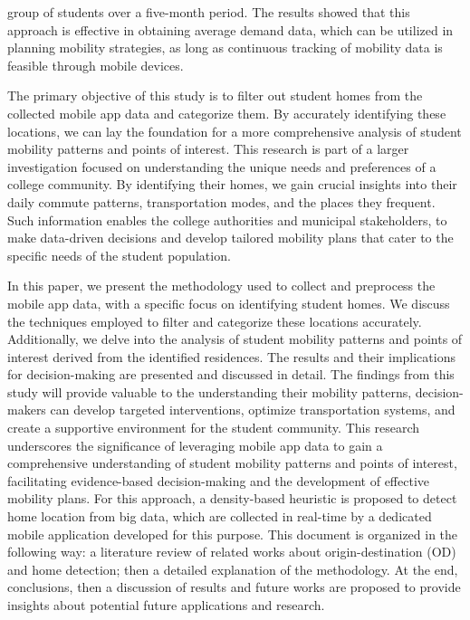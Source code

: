 \documentclass[runningheads]{llncs}
\begin{document}
group of students over a five-month period. The results showed that this approach is effective in obtaining average demand data, which can be utilized in planning mobility strategies, as long as continuous tracking of mobility data is feasible through mobile devices.

The primary objective of this study is to filter out student homes from the collected mobile app data and categorize them. By accurately identifying these locations, we can lay the foundation for a more comprehensive analysis of student mobility patterns and points of interest. This research is part of a larger investigation focused on understanding the unique needs and preferences of a college community. By identifying their homes, we gain crucial insights into their daily commute patterns, transportation modes, and the places they frequent. Such information enables the college authorities and municipal stakeholders, to make data-driven decisions and develop tailored mobility plans that cater to the specific needs of the student population.

In this paper, we present the methodology used to collect and preprocess the mobile app data, with a specific focus on identifying student homes. We discuss the techniques employed to filter and categorize these locations accurately. Additionally, we delve into the analysis of student mobility patterns and points of interest derived from the identified residences. The results and their implications for decision-making are presented and discussed in detail.
The findings from this study will provide valuable to the understanding their mobility patterns, decision-makers can develop targeted interventions, optimize transportation systems, and create a supportive environment for the student community. This research underscores the significance of leveraging mobile app data to gain a comprehensive understanding of student mobility patterns and points of interest, facilitating evidence-based decision-making and the development of effective mobility plans. For this approach, a density-based heuristic is proposed to detect home location from big data, which are collected in real-time by a dedicated mobile application developed for this purpose. This document is organized in the following way: a literature review of related works about origin-destination (OD) and home detection; then a detailed explanation of the methodology. At the end, conclusions, then a discussion of results and future works are proposed to provide insights about potential future applications and research.
\end{document}
